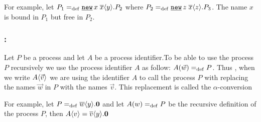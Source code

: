 For example, let $P_1\define\procres{x}{\out{x}{y}.P_2}$ where $P_2\define\procres{z}{\out{x}{z}.P_3}$. The name $x$ is bound in $P_1$ but free in $P_2$.


\subsubsection{:}
Let $P$ be a process and let $A$ be a process identifier.To be able to use the process $P$ recursively we use the process identifier $A$ as follow: $A(\vec{w})=_{\mathrm{def}}{}P$. Thus , when we write $A\langle\vec{v}\rangle$ we are using the identifier $A$ to call the process $P$ with replacing the names $\vec{w}$ in $P$ with the names $\vec{v}$. This replacement is called the $\alpha$-conversion

For example, let $P=_{\mathrm{def}}\overline{w}\langle y\rangle.\mathbf{0}$ and let $A(w)=_{\mathrm{def}}{}P$ be the recursive definition of the process $P$, then $A\langle v\rangle = \overline{v}\langle y\rangle.\mathbf{0}$ 

